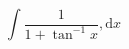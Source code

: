 \documentclass[border=2pt,varwidth=true]{standalone}
\begin{document}
\begin{displaymath}
\int  \frac{1}{1 + \tan^{-1} x} , \mathrm{d}x
\end{displaymath}
\end{document}
